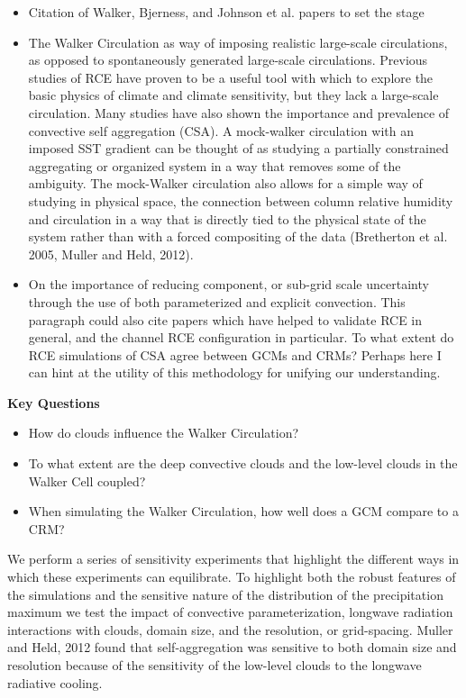 \documentclass[11pt]{article}   	%
\begin{document}
\begin{itemize}
  \item{Citation of Walker, Bjerness, and Johnson et al. papers to set the stage}
  \item{The Walker Circulation as way of imposing realistic large-scale circulations, as opposed to spontaneously generated large-scale
  circulations.  Previous studies of RCE have proven to be a 
  useful tool with which to explore the basic physics of climate and climate sensitivity, but they lack a large-scale circulation.  Many 
  studies have also shown the importance and prevalence of convective self aggregation (CSA).  A mock-walker circulation with an
  imposed SST gradient can be thought of as studying a partially constrained aggregating or organized system in a way that removes
  some of the ambiguity.  The mock-Walker circulation also allows for a simple way of studying in physical space, the connection
  between column relative humidity and circulation in a way that is directly tied to the physical state of the system rather than with
  a forced compositing of the data (Bretherton et al. 2005, Muller and Held, 2012).}
  \item{On the importance of reducing component, or sub-grid scale uncertainty through the use of both parameterized and explicit 
  convection.  This paragraph could also cite papers which have helped to validate RCE in general, and the channel RCE configuration
  in particular.  To what extent do RCE simulations of CSA agree between GCMs and CRMs?  Perhaps here I can hint at the utility of 
  this methodology for unifying our understanding.}
\end{itemize}

\textbf{Key Questions}
\begin{itemize}
  \item{How do clouds influence the Walker Circulation?}
  \item{To what extent are the deep convective clouds and the low-level clouds in the Walker Cell coupled?}
  \item{When simulating the Walker Circulation, how well does a GCM compare to a CRM?}  
\end{itemize}

We perform a series of sensitivity experiments that highlight the different ways in which these experiments can equilibrate.  To 
highlight both the robust features of the simulations and the sensitive nature of the distribution of the precipitation maximum 
we test the impact of convective parameterization, 
longwave radiation interactions with clouds, domain size, 
and the resolution, or grid-spacing.    Muller and Held, 2012 found that self-aggregation was sensitive to both domain size and resolution
because of the sensitivity of the low-level clouds to the longwave radiative cooling.  
\end{document}
